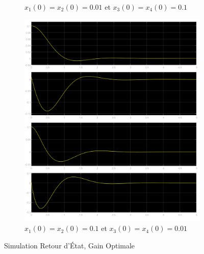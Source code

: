\documentclass[class=article, crop=false]{standalone}
\begin{document}
\begin{resolution}
\begin{figure}[H]
\begin{subfigure}[b]{0.475\textwidth}
            \caption{$x_1(0) = x_2(0) = 0.01$ et $x_3(0) = x_4(0) = 0.1$}
        \end{subfigure}
        \begin{subfigure}[b]{0.475\textwidth}
            \centering
            \includegraphics[width=\textwidth]{../images/simulink_scope3_0_1_01.png}
            \caption{$x_1(0) = x_2(0) = 0.1$ et $x_3(0) = x_4(0) = 0.01$}
        \end{subfigure}
        \caption{Simulation Retour d'État, Gain Optimale}
    \end{figure}
\end{resolution}

\newpage
\end{document}
